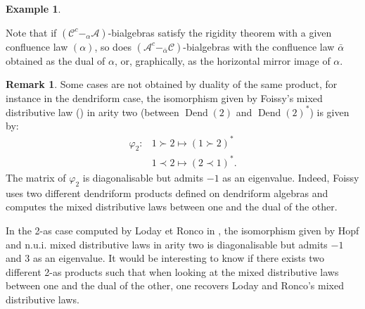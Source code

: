 \documentclass[11pt,leqno]{amsart}
\theoremstyle{definition}
\newtheorem{remark}[definition]{Remark}
\newtheorem{example}[definition]{Example}
\theoremstyle{plain}
\newcommand{\A}{ \mathcal{A} }
\newcommand{\C}{ \mathcal{C} }
\begin{document}
\begin{example}
\begin{itemize}


\end{itemize}
Note that if $(\C^c-_{\alpha}\A)$-bialgebras satisfy the rigidity theorem with a given confluence law $(\alpha)$, so does $(\A^c-_{\bar{\alpha}}\C)$-bialgebras with the confluence law $\bar{\alpha}$ obtained as the dual of $\alpha$, or, graphically, as the horizontal mirror image of $\alpha$.
\end{example}

\begin{remark}
Some cases are not obtained by duality of the same product, for instance in the dendriform case, the isomorphism given by Foissy's mixed distributive law (\cite{Foissy})  in arity two (between $\operatorname{Dend}(2)$ and $\operatorname{Dend}(2)^*$) is given by: 
\begin{align*}
 \varphi_2: & 1\succ2 \mapsto (1\succ2)^* \\
  & 1 \prec 2 \mapsto (2 \prec 1)^*.
\end{align*}
The matrix of $\varphi_2$ is diagonalisable but admits $-1$ as an eigenvalue. Indeed, Foissy uses two different dendriform products defined on dendriform algebras and computes the mixed distributive laws between one and the dual of the other.


In the 2-as case computed by Loday et Ronco in \cite{nui}, the isomorphism given by Hopf and n.u.i. mixed distributive laws in arity two  is diagonalisable but admits $-1$ and $3$ as an eigenvalue. It would be interesting to know if there exists two different 2-as products such that when looking at the mixed distributive laws between one and the dual of the other, one recovers Loday and Ronco's mixed distributive laws. 
\end{remark}
\end{document}
